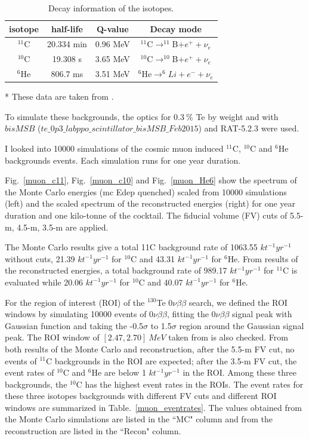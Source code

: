 \begin{table}[ht]
	\caption{Decay information of the isotopes.}\label{decayIso}
	\centering	
	\begin{tabular*}{100mm}{c@{\extracolsep{\fill}}ccc}
		\toprule 
		isotope &half-life & Q-value &  Decay mode\\
		\midrule
		$^{11}$C & 20.334 min & 0.96 MeV&  $^{11}$C$\to ^{11}$B$+e^++\nu_e$\\
		$^{10}$C & 19.308 s & 3.65 MeV & $^{10}$C$\to^{10}$B$+e^+ +\nu_e$\\
		$^{6}$He &806.7 ms & 3.51 MeV &  $^{6}$He$\to^{6}Li+e^-+\nu_e$\\
		\bottomrule	
	\end{tabular*}
\end{table}  
* These data are taken from \cite{nndc}.


To simulate these backgrounds, the optics for $0.3~\%$ Te by weight and with $bisMSB$ ($te\_0p3\_labppo\_scintillator\_bisMSB\_Feb2015$)
and RAT-5.2.3 were used.



I looked into 10000 simulations of the cosmic muon induced $^{11}$C, $^{10}$C and $^6$He backgrounds events. Each simulation runs for one
year duration.

Fig.~\ref{muon_c11}, Fig.~\ref{muon_c10} and Fig.~\ref{muon_He6} show the spectrum of the Monte Carlo energies (mc Edep quenched) scaled from 10000 simulations
(left) and the scaled spectrum of the reconstructed energies (right) for one year duration and one kilo-tonne of the
cocktail. The fiducial volume (FV) cuts of 5.5-m, 4.5-m, 3.5-m are applied.

The Monte Carlo results give a total 11C background rate of 1063.55 $kt^{-1}yr^{-1}$ without cuts, 21.39 $kt^{-1}yr^{-1}$ for
$^{10}$C and 43.31 $kt^{-1}yr^{-1}$ for $^6$He.
From results of the reconstructed energies, a total background rate of 989.17 $kt^{-1}yr^{-1}$ for $^{11}$C is evaluated while
20.06 $kt^{-1}yr^{-1}$ for $^{10}$C and 40.07 $kt^{-1}yr^{-1}$ for $^6$He.

For the region of interest (ROI) of the $^{130}$Te $0\nu\beta\beta$ search, we defined the ROI windows by simulating 10000 events of $0\nu\beta\beta$,
fitting the $0\nu\beta\beta$ signal peak with Gaussian function and taking the -0.5$\sigma$ to 1.5$\sigma$ region around the Gaussian signal
peak. The ROI window of $[2.47, 2.70]~MeV$ taken from \cite{whitepaper} is also checked. From both
results of the Monte Carlo and reconstruction, after the 5.5-m FV cut, no events of $^{11}$C backgrounds in the ROI are
expected; after the 3.5-m FV cut, the event rates of $^{10}$C and $^6$He are below 1 $kt^{-1}yr^{-1}$ in the ROI. Among these
three backgrounds, the $^{10}$C has the highest event rates in the ROIs.
The event rates for these three isotopes backgrounds with different FV cuts and different ROI windows are
summarized in Table.~\ref{muon_eventrates}. The values obtained from the Monte Carlo simulations are listed in the ``MC" column and
from the reconstruction are listed in the ``Recon" column.

